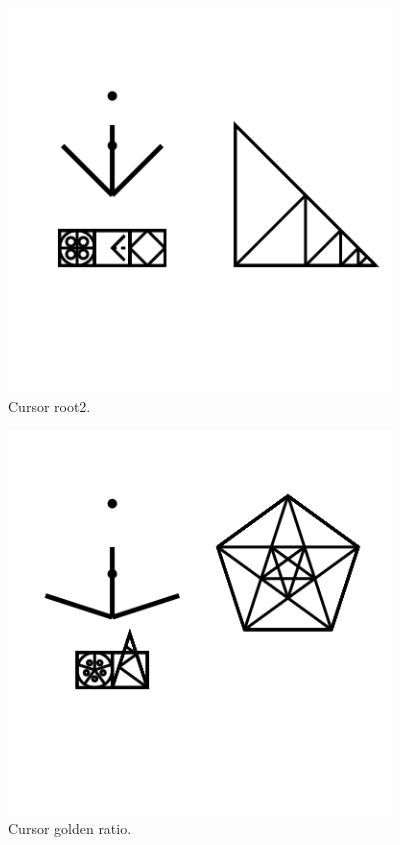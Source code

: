 \begin{figure}
	\centering
	\includegraphics[width=4in]{figures/web2d/cursorroot2.png}
	\caption[cursorroot2]
	{Cursor root2.}
\end{figure}
\begin{figure}
	\centering
	\includegraphics[width=4in]{figures/web2d/cursorgolden.png}
	\caption[cursorgolden]
	{Cursor golden ratio.}
\end{figure}
